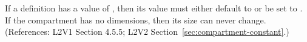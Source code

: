 If a \Compartment definition has a  value of
, then its   value must either default to or be
set to .  If the compartment has no dimensions, then its size can
never change.  (References: L2V1 Section 4.5.5; L2V2
Section~\ref{sec:compartment-constant}.)
